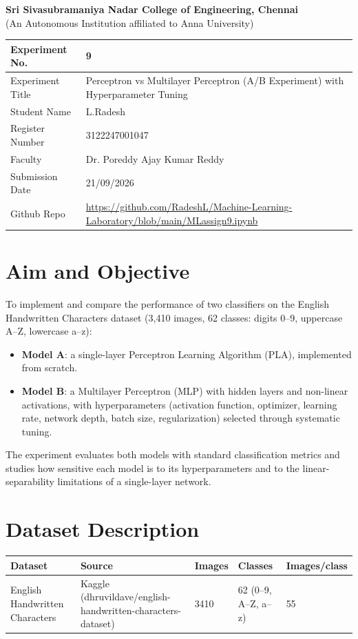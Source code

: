 \documentclass[12pt,a4paper]{article}
\begin{document}
\begin{center}
{\large \textbf{Sri Sivasubramaniya Nadar College of Engineering, Chennai}}\\
{\small (An Autonomous Institution affiliated to Anna University)}
\end{center}
\vspace{0.3cm}

\begin{tabular}{|p{4cm}|p{11cm}|}
\hline
Experiment No. & 9 \\ \hline
Experiment Title & Perceptron vs Multilayer Perceptron (A/B Experiment) with Hyperparameter Tuning \\ \hline
Student Name & L.Radesh \\ \hline
Register Number & 3122247001047 \\ \hline
Faculty & Dr. Poreddy Ajay Kumar Reddy \\ \hline
Submission Date & 21/09/2026 \\ \hline
Github Repo & \url{https://github.com/RadeshL/Machine-Learning-Laboratory/blob/main/MLassign9.ipynb} \\ \hline
\end{tabular}

\section{Aim and Objective}
To implement and compare the performance of two classifiers on the English Handwritten Characters
dataset (3{,}410 images, 62 classes: digits 0--9, uppercase A--Z, lowercase a--z):
\begin{itemize}
\item \textbf{Model A}: a single-layer Perceptron Learning Algorithm (PLA), implemented from scratch.
\item \textbf{Model B}: a Multilayer Perceptron (MLP) with hidden layers and non-linear activations,
with hyperparameters (activation function, optimizer, learning rate, network depth, batch size,
regularization) selected through systematic tuning.
\end{itemize}
The experiment evaluates both models with standard classification metrics and studies how sensitive
each model is to its hyperparameters and to the linear-separability limitations of a single-layer
network.

\section{Dataset Description}
\begin{longtable}{|p{4cm}|p{5cm}|p{1.6cm}|p{1.8cm}|p{2.2cm}|}
\hline
\textbf{Dataset} & \textbf{Source} & \textbf{Images} & \textbf{Classes} & \textbf{Images/class} \\ \hline
English Handwritten Characters & Kaggle (dhruvildave/english-handwritten-characters-dataset) & 3410 & 62 (0--9, A--Z, a--z) & 55 \\ \hline
\end{longtable}
\end{document}
